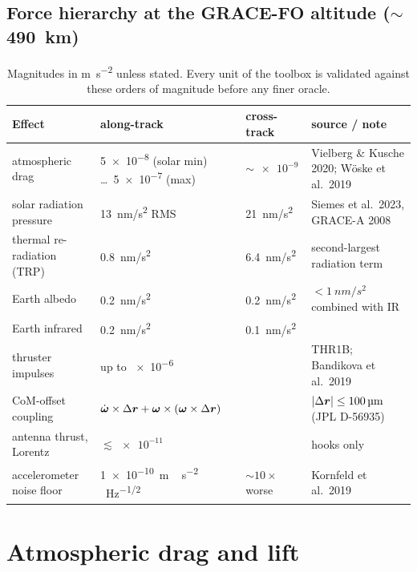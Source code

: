 \subsection{Force hierarchy at the GRACE-FO altitude ($\sim$\SI{490}{\kilo\metre})}
\begin{table}[h]\centering\footnotesize
\begin{tabular}{@{}lllp{4.4cm}@{}}\toprule
Effect & along-track & cross-track & source / note\\\midrule
atmospheric drag & \num{5e-8} (solar min) \ldots\ \num{5e-7} (max) & $\sim\num{e-9}$ & Vielberg \& Kusche 2020; Wöske et al.\ 2019\\
solar radiation pressure & \SI{13}{nm/s^2} RMS & \SI{21}{nm/s^2} & Siemes et al.\ 2023, GRACE-A 2008\\
thermal re-radiation (TRP) & \SI{0.8}{nm/s^2} & \SI{6.4}{nm/s^2} & second-largest radiation term\\
Earth albedo & \SI{0.2}{nm/s^2} & \SI{0.2}{nm/s^2} & $<\SI{1}{nm/s^2}$ combined with IR\\
Earth infrared & \SI{0.2}{nm/s^2} & \SI{0.1}{nm/s^2} & \\
thruster impulses & up to \num{e-6} & & THR1B; Bandikova et al.\ 2019\\
CoM-offset coupling & $\dot{\bm{\omega}}\times\Delta\bm{r}+\bm{\omega}\times(\bm{\omega}\times\Delta\bm{r})$ & & $|\Delta\bm{r}|\le\SI{100}{\micro\metre}$ (JPL D-56935)\\
antenna thrust, Lorentz & $\lesssim\num{e-11}$ & & hooks only\\
accelerometer noise floor & \SI{1e-10}{m\,s^{-2}\,Hz^{-1/2}} & $\sim10\times$ worse & Kornfeld et al.\ 2019\\\bottomrule
\end{tabular}
\caption{Magnitudes in \si{\metre\per\second\squared} unless stated. Every unit of the toolbox is validated against these orders of magnitude before any finer oracle.}
\end{table}

\section{Atmospheric drag and lift}
